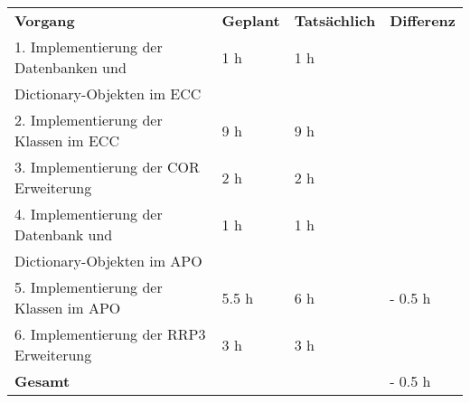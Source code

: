 \begin{tabu}{llll}
\rowfont{\bfseries\leavevmode\color{headingfont}}\textbf{Vorgang} & \textbf{Geplant} & \textbf{Tatsächlich} & \textbf{Differenz} \\
1. Implementierung der Datenbanken und & 1 h & 1 h & \\ 
Dictionary-Objekten im ECC & & & \\
2. Implementierung der Klassen im ECC & 9 h & 9 h & \\
3.  Implementierung der COR Erweiterung & 2 h & 2 h & \\
4. Implementierung der Datenbank und & 1 h & 1 h & \\ 
Dictionary-Objekten im APO & & & \\
5. Implementierung der Klassen im APO & 5.5 h & 6 h & - 0.5 h \\
6.  Implementierung der RRP3 Erweiterung & 3 h & 3 h & \\
\hline
\hline
{}\textbf{Gesamt} & & & - 0.5 h \\
\end{tabu}